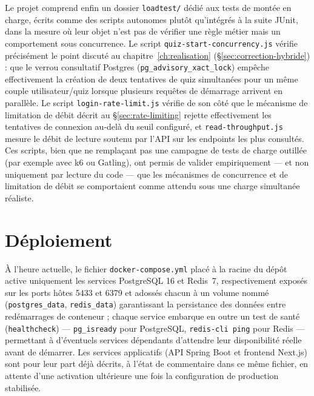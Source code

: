 Le projet comprend enfin un dossier \texttt{loadtest/} dédié aux tests de
montée en charge, écrits comme des scripts autonomes plutôt qu'intégrés à
la suite JUnit, dans la mesure où leur objet n'est pas de vérifier une
règle métier mais un comportement sous concurrence. Le script
\texttt{quiz-start-concurrency.js} vérifie précisément le point discuté au
chapitre~\ref{ch:realisation} (\S\ref{sec:correction-hybride}) : que le
verrou consultatif Postgres (\texttt{pg\_advisory\_xact\_lock}) empêche
effectivement la création de deux tentatives de quiz simultanées pour un
même couple utilisateur/quiz lorsque plusieurs requêtes de démarrage
arrivent en parallèle. Le script \texttt{login-rate-limit.js} vérifie de
son côté que le mécanisme de limitation de débit décrit au
\S\ref{sec:rate-limiting} rejette effectivement les tentatives de
connexion au-delà du seuil configuré, et \texttt{read-throughput.js} mesure
le débit de lecture soutenu par l'API sur les endpoints les plus
consultés. Ces scripts, bien que ne remplaçant pas une campagne de tests
de charge outillée (par exemple avec k6 ou Gatling), ont permis de valider
empiriquement --- et non uniquement par lecture du code --- que les
mécanismes de concurrence et de limitation de débit se comportaient
comme attendu sous une charge simultanée réaliste.

\section{Déploiement}

À l'heure actuelle, le fichier \texttt{docker-compose.yml} placé à
la racine du dépôt active uniquement les services PostgreSQL 16 et Redis~7,
respectivement exposés sur les ports hôtes 5433 et 6379 et adossés chacun
à un volume nommé (\texttt{postgres\_data}, \texttt{redis\_data}) garantissant
la persistance des données entre redémarrages de conteneur ; chaque service
embarque en outre un test de santé (\texttt{healthcheck}) --- \texttt{pg\_isready}
pour PostgreSQL, \texttt{redis-cli ping} pour Redis --- permettant à
d'éventuels services dépendants d'attendre leur disponibilité réelle avant
de démarrer. Les services applicatifs (API Spring Boot et frontend
Next.js) sont pour leur part déjà décrits, à l'état de commentaire dans ce
même fichier, en attente d'une activation ultérieure une fois la
configuration de production stabilisée.

